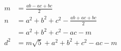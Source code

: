 \begin{align*}
m  &= \frac{ ab - ac + bc}{2} \\
n  &= a^2 + b^2 + c^2 - \frac{ ab + ac + bc }{2} \\
   &= a^2 + b^2 + c^2 - ac - m \\
d^2 &= m\sqrt{5} + a^2 + b^2 + c^2 - ac - m
\end{align*}